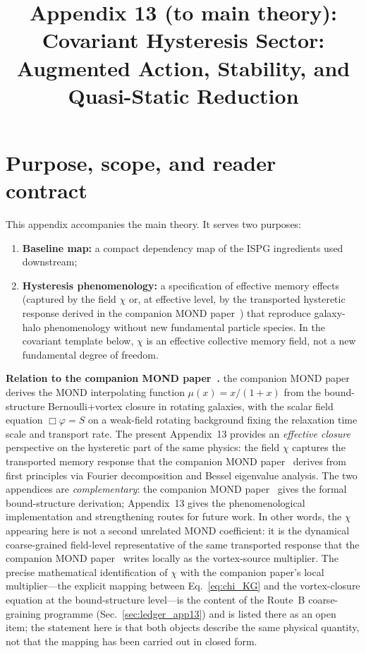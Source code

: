 \documentclass[11pt]{article}
\title{Appendix 13 (to main theory): Covariant Hysteresis Sector: Augmented Action, Stability, and Quasi-Static Reduction}
\author{}
\date{}
\begin{document}
\let\phi\varphi
\maketitle

\section*{Purpose, scope, and reader contract}
This appendix accompanies the main theory. It serves two purposes:
\begin{enumerate}
\item \textbf{Baseline map:} a compact dependency map of the ISPG ingredients used downstream;
\item \textbf{Hysteresis phenomenology:} a specification of effective memory effects (captured by the field $\chi$ or, at effective level, by the transported hysteretic response derived in the companion MOND paper~\cite{Lotishvili2026MOND}) that reproduce galaxy-halo phenomenology without new fundamental particle species.  In the covariant template below, $\chi$ is an effective collective memory field, not a new fundamental degree of freedom.
\end{enumerate}

\textbf{Relation to the companion MOND paper~\cite{Lotishvili2026MOND}.}
the companion MOND paper~\cite{Lotishvili2026MOND} derives the MOND interpolating function $\mu(x)=x/(1+x)$ from the bound-structure Bernoulli$+$vortex closure in rotating galaxies, with the scalar field equation $\Box\varphi=S$ on a weak-field rotating background fixing the relaxation time scale and transport rate. The present Appendix~13 provides an \emph{effective closure} perspective on the hysteretic part of the same physics: the field $\chi$ captures the transported memory response that the companion MOND paper~\cite{Lotishvili2026MOND} derives from first principles via Fourier decomposition and Bessel eigenvalue analysis. The two appendices are \emph{complementary}: the companion MOND paper~\cite{Lotishvili2026MOND} gives the formal bound-structure derivation; Appendix~13 gives the phenomenological implementation and strengthening routes for future work.
In other words, the $\chi$ appearing here is not a second unrelated MOND coefficient: it is the dynamical coarse-grained field-level representative of the same transported response that the companion MOND paper~\cite{Lotishvili2026MOND} writes locally as the vortex-source multiplier.  The precise mathematical identification of $\chi$ with the companion paper's local multiplier---the explicit mapping between Eq.~\eqref{eq:chi_KG} and the vortex-closure equation at the bound-structure level---is the content of the Route~B coarse-graining programme (Sec.~\ref{sec:ledger_app13}) and is listed there as an open item; the statement here is that both objects describe the same physical quantity, not that the mapping has been carried out in closed form.
\end{document}
